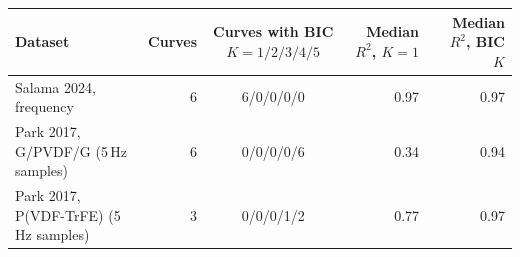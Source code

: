\begin{tabular}{l r c r r}
\toprule
Dataset & Curves & Curves with BIC $K = 1/2/3/4/5$ & Median $R^2$, $K=1$ & Median $R^2$, BIC $K$ \\
\midrule
Salama 2024, frequency & 6 & 6/0/0/0/0 & 0.97 & 0.97 \\
Park 2017, G/PVDF/G (5\,Hz samples) & 6 & 0/0/0/0/6 & 0.34 & 0.94 \\
Park 2017, P(VDF-TrFE) (5\,Hz samples) & 3 & 0/0/0/1/2 & 0.77 & 0.97 \\
\bottomrule
\end{tabular}
